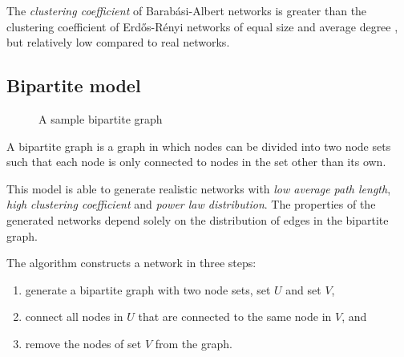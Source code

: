 \documentclass[a4paper,11pt,titlepage]{article}
\begin{document}
The \emph{clustering coefficient} of Barab\'{a}si-Albert networks is greater
than the clustering coefficient of Erd\H{o}s-R\'{e}nyi networks of equal size
and average degree \cite{oconn11}, but relatively low compared to real networks.


\subsection{Bipartite model}

\begin{figure}[ht!]
  \centering
  
  \caption{A sample bipartite graph}
\end{figure}

A bipartite graph is a graph in which nodes can be divided into two
node sets such that each node is only connected to nodes in the set
other than its own.

This model is able to generate realistic networks with \emph{low
  average path length}, \emph{high clustering coefficient} and
\emph{power law distribution}. The properties of the generated
networks depend solely on the distribution of edges in the bipartite
graph.

\noindent The algorithm constructs a network in three steps:
\begin{enumerate}
  \item generate a bipartite graph with two node sets, set $U$ and set
    $V$,
  \item connect all nodes in $U$ that are connected to the same node
    in $V$, and
  \item remove the nodes of set $V$ from the graph.
\end{enumerate}
\end{document}
